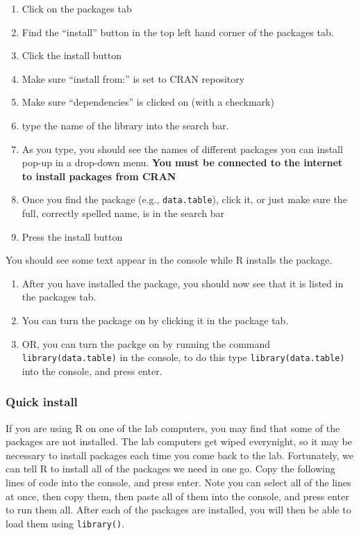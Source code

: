 \documentclass[
]{book}
\providecommand{\tightlist}{%
  \setlength{\itemsep}{0pt}\setlength{\parskip}{0pt}}
\begin{document}
\begin{enumerate}
\def\labelenumi{\arabic{enumi}.}
\tightlist
\item
  Click on the packages tab
\item
  Find the ``install'' button in the top left hand corner of the packages tab.
\item
  Click the install button
\item
  Make sure ``install from:'' is set to CRAN repository
\item
  Make sure ``dependencies'' is clicked on (with a checkmark)
\item
  type the name of the library into the search bar.
\item
  As you type, you should see the names of different packages you can install pop-up in a drop-down menu. \textbf{You must be connected to the internet to install packages from CRAN}
\item
  Once you find the package (e.g., \texttt{data.table}), click it, or just make sure the full, correctly spelled name, is in the search bar
\item
  Press the install button
\end{enumerate}

You should see some text appear in the console while R installs the package.

\begin{enumerate}
\def\labelenumi{\arabic{enumi}.}
\setcounter{enumi}{9}
\tightlist
\item
  After you have installed the package, you should now see that it is listed in the packages tab.
\item
  You can turn the package on by clicking it in the package tab.
\item
  OR, you can turn the packge on by running the command \texttt{library(data.table)} in the console, to do this type \texttt{library(data.table)} into the console, and press enter.
\end{enumerate}

\hypertarget{quick-install}{%
\subsubsection{Quick install}\label{quick-install}}

If you are using R on one of the lab computers, you may find that some of the packages are not installed. The lab computers get wiped everynight, so it may be necessary to install packages each time you come back to the lab. Fortunately, we can tell R to install all of the packages we need in one go. Copy the following lines of code into the console, and press enter. Note you can select all of the lines at once, then copy them, then paste all of them into the console, and press enter to run them all. After each of the packages are installed, you will then be able to load them using \texttt{library()}.
\end{document}
